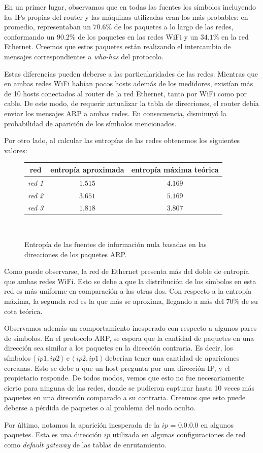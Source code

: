 En un primer lugar, observamos que en todas las fuentes los símbolos incluyendo las IPs propias del router y las máquinas utilizadas eran los más probables: en promedio, representaban un $70.6\%$ de los paquetes a lo largo de las redes, conformando un $90.2\%$ de los paquetes en las redes WiFi y un $34.1\%$ en la red Ethernet. Creemos que estos paquetes están realizando el intercambio de mensajes correspondientes a \textit{who-has} del protocolo.

Estas diferencias pueden deberse a las particularidades de las redes. Mientras que en ambas redes WiFi habían pocos hosts además de los medidores, existían más de 10 hosts conectados al router de la red Ethernet, tanto por WiFi como por cable. De este modo, de requerir actualizar la tabla de direcciones, el router debía enviar los mensajes ARP a ambas redes. En consecuencia, disminuyó la probabilidad de aparición de los símbolos mencionados.

Por otro lado, al calcular las entropías de las redes obtenemos los siguientes valores:

\vspace{1em}
\begin{figure}[!htbp]
    \begin{tabular}{ |c|c|c| } 
    \hline
    red & entropía aproximada & entropía máxima teórica\\
    \hline
    \textit{red 1} & $1.515$ & $4.169$ \\
    \textit{red 2} & $3.651$ & $5.169$ \\
    \textit{red 3} & $1.818$ & $3.807$ \\
    \hline
    \end{tabular} \\
    \bigskip
    \caption{Entropía de las fuentes de información nula basadas en las direcciones de los paquetes ARP.} \label{entropia}
\end{figure}

Como puede observarse, la red de Ethernet presenta más del doble de entropía que ambas redes WiFi. Esto se debe a que la distribución de los símbolos en esta red es más uniforme en comparación a las otras dos. Con respecto a la entropía máxima, la segunda red es la que más se aproxima, llegando a más del $70\%$ de su cota teórica.

Observamos además un comportamiento inesperado con respecto a algunos pares de símbolos. En el protocolo ARP, se espera que la cantidad de paquetes en una dirección sea similar a los paquetes en la dirección contraria. Es decir, los símbolos $\langle \ ip1, ip2\ \rangle$ e $\langle\ ip2, ip1\ \rangle$ deberían tener una cantidad de apariciones cercanas. Esto se debe a que un host pregunta por una dirección IP, y el propietario responde. De todos modos, vemos que esto no fue necesariamente cierto para ninguna de las redes, donde se pudieron capturar hasta 10 veces más paquetes en una dirección comparado a su contraria. Creemos que esto puede deberse a pérdida de paquetes o al problema del nodo oculto.

Por último, notamos la aparición inesperada de la $ip$ = 0.0.0.0 en algunos paquetes. Esta es una dirección $ip$ utilizada en algunas configuraciones de red como \textit{default gateway} de las tablas de enrutamiento.